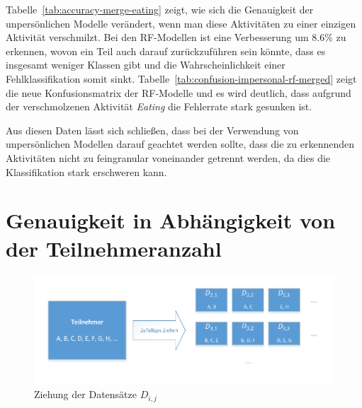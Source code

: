 Tabelle~\ref{tab:accuracy-merge-eating} zeigt, wie sich die Genauigkeit der unpersönlichen Modelle verändert, wenn man diese Aktivitäten zu einer einzigen Aktivität verschmilzt. Bei den RF-Modellen ist eine Verbesserung um $8.6 \%$ zu erkennen, wovon ein Teil auch darauf zurückzuführen sein könnte, dass es insgesamt weniger Klassen gibt und die Wahrscheinlichkeit einer Fehlklassifikation somit sinkt. Tabelle~\ref{tab:confusion-impersonal-rf-merged} zeigt die neue Konfusionsmatrix der RF-Modelle und es wird deutlich, dass aufgrund der verschmolzenen Aktivität \textit{Eating} die Fehlerrate stark gesunken ist.

Aus diesen Daten lässt sich schließen, dass bei der Verwendung von unpersönlichen Modellen darauf geachtet werden sollte, dass die zu erkennenden Aktivitäten nicht zu feingranular voneinander getrennt werden, da dies die Klassifikation stark erschweren kann.

\section{Genauigkeit in Abhängigkeit von der Teilnehmeranzahl}
\label{sec:accuracy-usercount}
\begin{figure}
\centering
\includegraphics[clip, trim=7mm 7mm 7mm 6mm, width=\textwidth]{img/random-set-draw}
\caption{Ziehung der Datensätze $D_{i,j}$}
\label{fig:random-set-draw}
\end{figure}

